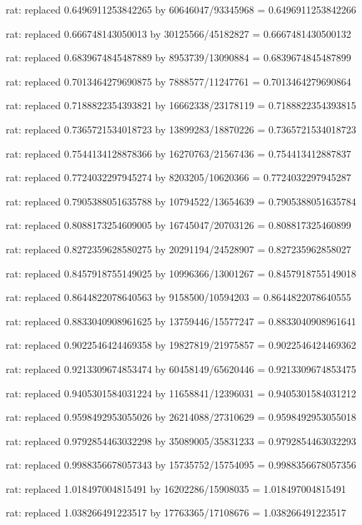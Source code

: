 \documentclass[a4paper,10pt]{article}
\begin{document}
\begin{eulernotebook}
\begin{eulercomment}
\begin{eulercomment}
\begin{eulercomment}
\begin{eulercomment}
\begin{eulercomment}
\begin{eulercomment}
\begin{eulercomment}
\begin{eulercomment}
\begin{eulercomment}
\begin{eulercomment}
\begin{eulercomment}
\begin{eulercomment}
\begin{eulercomment}
\begin{eulercomment}
\begin{eulercomment}
\begin{eulercomment}
\begin{euleroutput}
  rat: replaced 0.6496911253842265 by 60646047/93345968 = 0.6496911253842266
  
  rat: replaced 0.666748143050013 by 30125566/45182827 = 0.6667481430500132
  
  rat: replaced 0.6839674845487889 by 8953739/13090884 = 0.6839674845487899
  
  rat: replaced 0.7013464279690875 by 7888577/11247761 = 0.7013464279690864
  
  rat: replaced 0.7188822354393821 by 16662338/23178119 = 0.7188822354393815
  
  rat: replaced 0.7365721534018723 by 13899283/18870226 = 0.7365721534018723
  
  rat: replaced 0.7544134128878366 by 16270763/21567436 = 0.754413412887837
  
  rat: replaced 0.7724032297945274 by 8203205/10620366 = 0.7724032297945287
  
  rat: replaced 0.7905388051635788 by 10794522/13654639 = 0.7905388051635784
  
  rat: replaced 0.8088173254609005 by 16745047/20703126 = 0.808817325460899
  
  rat: replaced 0.8272359628580275 by 20291194/24528907 = 0.827235962858027
  
  rat: replaced 0.8457918755149025 by 10996366/13001267 = 0.8457918755149018
  
  rat: replaced 0.8644822078640563 by 9158500/10594203 = 0.8644822078640555
  
  rat: replaced 0.8833040908961625 by 13759446/15577247 = 0.8833040908961641
  
  rat: replaced 0.9022546424469358 by 19827819/21975857 = 0.9022546424469362
  
  rat: replaced 0.9213309674853474 by 60458149/65620446 = 0.9213309674853475
  
  rat: replaced 0.9405301584031224 by 11658841/12396031 = 0.9405301584031212
  
  rat: replaced 0.9598492953055026 by 26214088/27310629 = 0.9598492953055018
  
  rat: replaced 0.9792854463032298 by 35089005/35831233 = 0.9792854463032293
  
  rat: replaced 0.9988356678057343 by 15735752/15754095 = 0.9988356678057356
  
  rat: replaced 1.018497004815491 by 16202286/15908035 = 1.018497004815491
  
  rat: replaced 1.038266491223517 by 17763365/17108676 = 1.038266491223517
  

\end{euleroutput}
\end{eulercomment}
\end{eulercomment}
\end{eulercomment}
\end{eulercomment}
\end{eulercomment}
\end{eulercomment}
\end{eulercomment}
\end{eulercomment}
\end{eulercomment}
\end{eulercomment}
\end{eulercomment}
\end{eulercomment}
\end{eulercomment}
\end{eulercomment}
\end{eulercomment}
\end{eulercomment}
\end{eulernotebook}
\end{document}
